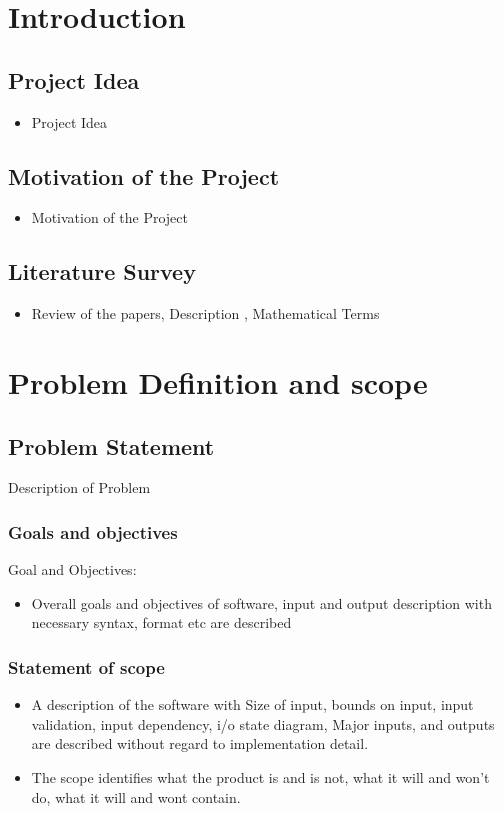 \documentclass[oneside,a4paper,12pt]{report}
\begin{document}
\chapter{Introduction}
\section{Project Idea}
\begin{itemize}
\item Project Idea
\end{itemize}


\section{Motivation of the Project}
\begin{itemize}
\item Motivation of the Project
\end{itemize}

\section{Literature Survey}
\begin{itemize}
\item Review of the papers, Description , Mathematical Terms
\end{itemize}


\chapter{Problem Definition and scope}
\section{Problem Statement}
Description of Problem


\subsection{Goals and objectives}
Goal and Objectives:
\begin{itemize}
  	\item Overall goals and objectives of software, input and output description with necessary syntax, format etc are described
\end{itemize}

 \subsection{Statement of scope}
	\begin{itemize}
	\item	A description of the software with Size of input, bounds on input, input validation, input dependency, i/o state diagram, Major inputs, and outputs are described without regard to implementation detail.
	\item The scope identifies what the product is and is not, what it will and won’t do, what it will and wont contain.
	\end{itemize}
\end{document}
